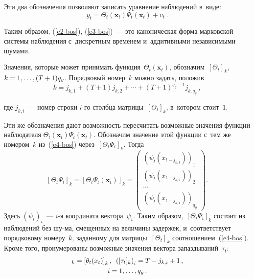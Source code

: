 \begin{multicols}{2}
     Эти два обозначения поз\-во\-ля\-ют записать уравнение наблюдений в~\mbox{виде}:
     \begin{equation}
     y_t=\Theta_t(\mathbf{x}_t)\Psi_t(\mathbf{x}_t) +v_t\,.
     \label{e3-bos}
     \end{equation}
     
     Таким образом, (\ref{e2-bos}), (\ref{e3-bos})~--- это каноническая форма 
марковской сис\-те\-мы наблюдения с~дискретным временем и~аддитивными 
независимыми шу\-мами.
     
     Значения, которые может принимать 
функция~$\Theta_t(\mathbf{x}_t)$, обозначим~$\left[ \Theta_t\right]_k$, 
$k\hm=1,\ldots , (T\hm+1)q_y$. Порядковый номер~$k$ мож\-но задать, 
по\-ложив
     \begin{equation}
     k=j_{k,1} +(T+1) j_{k,2} +\cdots + (T+1)^{q_y-1} j_{k,q_y}\,,
     \label{e4-bos}
     \end{equation}
     
     \vspace*{-3pt}
     
     \pagebreak
     
     \noindent
где $j_{k,i}$~--- номер строки $i$-го столбца мат\-ри\-цы~$\left[ 
\Theta_t\right]_k$, в~котором сто\-ит~1.

     Эти же обозначения дают воз\-мож\-ность пе\-ре\-счи\-тать воз\-мож\-ные 
значения функции наблюдателя $\Theta_t(\mathbf{x}_t)\Psi_t (\mathbf{x}_t)$. 
Обозначим значение этой функ\-ции с~тем же номером~$k$ из~(\ref{e4-bos}) 
через~$\left[ \Theta_t \Psi_t\right]_k$. \mbox{Тогда}
     $$
     \left[ \Theta_t \Psi_t\right]_k= \left[ \Theta_t\Psi_t(\mathbf{x}_t)\right]_k= 
\begin{pmatrix}
     \left( \psi_t(x_{t-j_{k,1}})\right)_1\\[3pt]
     \left( \psi_t(x_{t-j_{k,2}})\right)_2\\[3pt]
     \cdots\\[3pt]
     \left( \psi_t(x_{t-j_{k,1}})\right)_{q_y}
     \end{pmatrix}.
     $$
     Здесь $(\psi_t)_i$~--- $i$-я координата вектора~$\psi_t$. Таким образом, 
$\left[ \Theta_t \Psi_t\right]_k$ со\-сто\-ит из наблюдений без шу-\linebreak ма, смещенных на 
величины задержек, и~соответствует порядковому номеру~$k$, заданному 
для мат\-ри\-цы~$\left[ \Theta_t\right]_k$ соотношением~(\ref{e4-bos}). Кроме 
того, пронумерованы воз\-мож\-ные значения вектора \mbox{за\-паз\-ды\-ва\-ний}~$\tau_t$:
     \begin{multline*}
     [\tau_t]_k =\left[ \theta_t(x_t)\right]_k, \enskip
     \left( [\tau_t]_k\right)_i=T-j_{k,i} +1\,,\\
     i=1,\ldots , q_y\,.
     \end{multline*}
     

\end{multicols}
